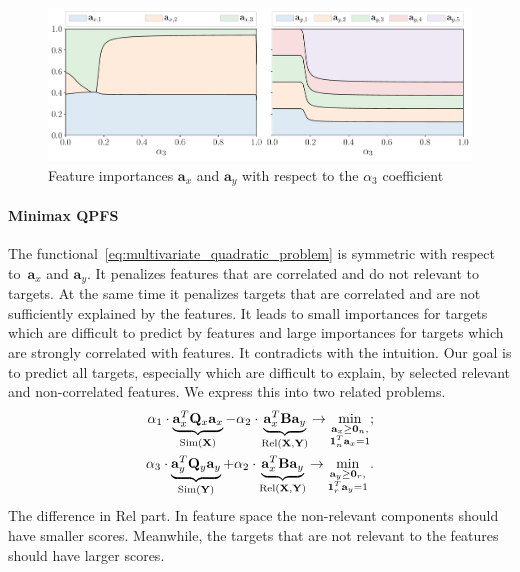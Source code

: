 \documentclass[12pt,twoside]{article}
\newcommand{\ba}{\mathbf{a}}
\newcommand{\bY}{\mathbf{Y}}
\newcommand{\bX}{\mathbf{X}}
\newcommand{\bQ}{\mathbf{Q}}
\newcommand{\bOne}{\boldsymbol{1}}
\newcommand{\bZero}{\boldsymbol{0}}
\begin{document}
\begin{figure}
	\centering
	\includegraphics[width=\linewidth]{figs/features_vs_alpha.pdf}
	\caption{Feature importances $\ba_x$ and $\ba_y$ with respect to the $\alpha_3$ coefficient}
	\label{fig:features_vs_alpha}
\end{figure}

\paragraph{Minimax QPFS}
The functional~\eqref{eq:multivariate_quadratic_problem} is symmetric with respect to~$\ba_x$ and $\ba_y$.
It penalizes features that are correlated and do not relevant to targets.
At the same time it penalizes targets that are correlated and are not sufficiently explained by the features.
It leads to small importances for targets which are difficult to predict by features and large importances for targets which are strongly correlated with features.
It contradicts with the intuition.
Our goal is to predict all targets, especially which are difficult to explain, by selected relevant and non-correlated features. We express this into two related problems.
\begin{align}
	\alpha_1 \cdot \underbrace{\ba_x^T \bQ_x \ba_x}_{\text{Sim}(\bX)} - \alpha_2 \cdot \underbrace{\vphantom{()} \ba_x^T\mathbf{B} \ba_y}_{\text{Rel}(\bX, \bY)} \rightarrow \min_{\substack{\ba_x \geq \bZero_n, \\ \bOne_n^T\ba_x=1}};
	\label{eq:x_qpfs}\\
	\alpha_3 \cdot \underbrace{\ba_y^T \bQ_y \ba_y}_{\text{Sim}(\bY)} + \alpha_2 \cdot \underbrace{\vphantom{()} \ba_x^T \mathbf{B} \ba_y}_{\text{Rel}(\bX, \bY)} \rightarrow \min_{\substack{\ba_y \geq \bZero_r,  \\ \bOne_r^T\ba_y=1}}.
	\label{eq:y_qpfs}
\end{align}
The difference in Rel part.
In feature space the non-relevant components should have smaller scores.
Meanwhile, the targets that are not relevant to the features should have larger scores.
\end{document}
